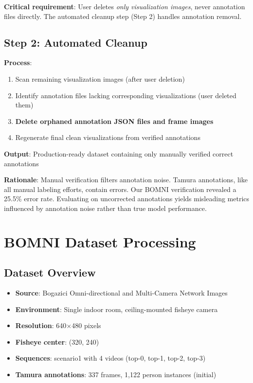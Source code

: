 \documentclass[11pt]{article}
\begin{document}
\textbf{Critical requirement}: User deletes \textit{only visualization images}, never annotation files directly. The automated cleanup step (Step 2) handles annotation removal.

\subsection{Step 2: Automated Cleanup}

\textbf{Process}:
\begin{enumerate}[leftmargin=*]
    \item Scan remaining visualization images (after user deletion)
    \item Identify annotation files lacking corresponding visualizations (user deleted them)
    \item \textbf{Delete orphaned annotation JSON files and frame images}
    \item Regenerate final clean visualizations from verified annotations
\end{enumerate}

\textbf{Output}: Production-ready dataset containing only manually verified correct annotations

\textbf{Rationale}: Manual verification filters annotation noise. Tamura annotations, like all manual labeling efforts, contain errors. Our BOMNI verification revealed a 25.5\% error rate. Evaluating on uncorrected annotations yields misleading metrics influenced by annotation noise rather than true model performance.

\section{BOMNI Dataset Processing}

\subsection{Dataset Overview}

\begin{itemize}[leftmargin=*]
    \item \textbf{Source}: Bogazici Omni-directional and Multi-Camera Network Images
    \item \textbf{Environment}: Single indoor room, ceiling-mounted fisheye camera
    \item \textbf{Resolution}: 640$\times$480 pixels
    \item \textbf{Fisheye center}: (320, 240)
    \item \textbf{Sequences}: scenario1 with 4 videos (top-0, top-1, top-2, top-3)
    \item \textbf{Tamura annotations}: 337 frames, 1,122 person instances (initial)
\end{itemize}
\end{document}
